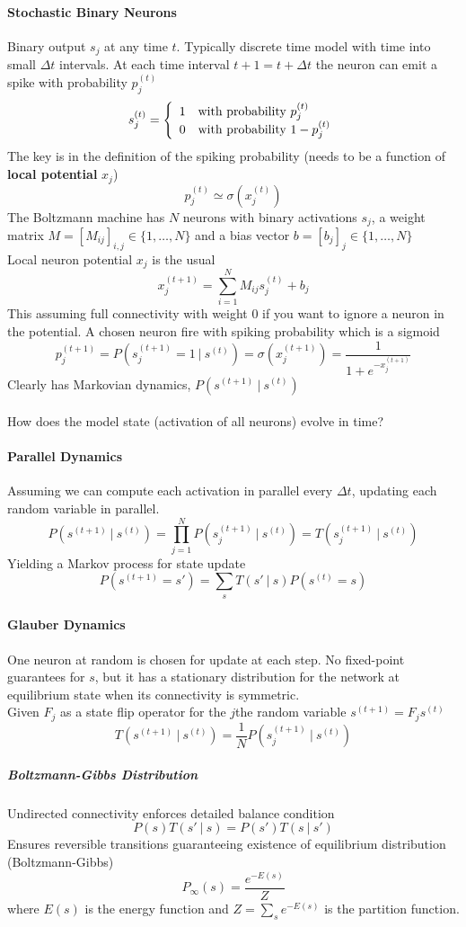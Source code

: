 \documentclass[10pt]{report}
\begin{document}
\paragraph{Stochastic Binary Neurons} Binary output $s_j$ at any time $t$. Typically discrete time model with time into small $\Delta t$ intervals. At each time interval $t+1 = t+\Delta t$ the neuron can emit a spike with probability $p_j^{(t)}$ $$s_j^{(t)} = \left\{\begin{array}{c l}
1&\text{with probability }p_j^{(t)}\\
0&\text{with probability }1-p_j^{(t)}
\end{array}\right.$$
The key is in the definition of the spiking probability (needs to be a function of \textbf{local potential} $x_j$) $$p_j^{(t)} \simeq \sigma(x_j^{(t)})$$
The Boltzmann machine has $N$ neurons with binary activations $s_j$, a weight matrix $M = [M_{ij}]_{i,j} \in \{1,\ldots,N\}$ and a bias vector $b = [b_j]_j\in\{1,\ldots,N\}$\\
Local neuron potential $x_j$ is the usual $$x_j^{(t+1)} = \sum_{i=1}^N M_{ij}s_j^{(t)} +b_j$$
This assuming full connectivity with weight $0$ if you want to ignore a neuron in the potential. A chosen neuron fire with spiking probability which is a sigmoid $$p_j^{(t+1)} = P\left(s_j^{(t+1)} = 1\:|\:s^{(t)}\right) = \sigma\left(x_j^{(t+1)}\right) = \frac{1}{1+e^{-x_j^{(t+1)}}}$$
Clearly has Markovian dynamics, $P(s^{(t+1)}\:|\:s^{(t)})$\\\\
How does the model state (activation of all neurons) evolve in time?
\paragraph{Parallel Dynamics} Assuming we can compute each activation in parallel every $\Delta t$, updating each random variable in parallel. $$P\left(s^{(t+1)}\:|\:s^{(t)}\right) = \prod_{j=1}^N P\left(s_j^{(t+1)}\:|\:s^{(t)}\right) = T\left(s_j^{(t+1)}\:|\:s^{(t)}\right)$$
Yielding a Markov process for state update
$$P\left(s^{(t+1)} = s'\right) = \sum_s T\left(s'\:|\:s\right)P\left(s^{(t)} = s\right)$$
\paragraph{Glauber Dynamics} One neuron at random is chosen for update at each step. No fixed-point guarantees for $s$, but it has a stationary distribution for the network at equilibrium state when its connectivity is symmetric.\\
Given $F_j$ as a state flip operator for the $j$the random variable $s^{(t+1)}=F_js^{(t)}$
$$T(s^{(t+1)}\:|\:s^{(t)}) = \frac{1}{N}P(s_j^{(t+1)}\:|\:s^{(t)})$$
\subparagraph{Boltzmann-Gibbs Distribution} Undirected connectivity enforces detailed balance condition $$P(s)T(s'\:|\:s) = P(s')T(s\:|\:s')$$
Ensures reversible transitions guaranteeing existence of equilibrium distribution (Boltzmann-Gibbs) $$P_\infty(s) = \frac{e^{-E(s)}}{Z}$$
where $E(s)$ is the energy function and $Z = \sum_se^{-E(s)}$ is the partition function.
\end{document}
